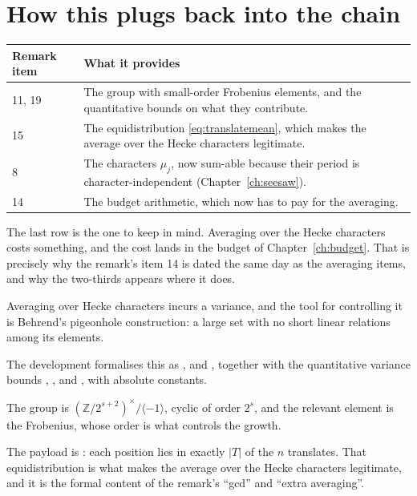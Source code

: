 \section{How this plugs back into the chain}\begin{center}
\begin{tabular}{@{}l>{\RaggedRight\arraybackslash\hyphenpenalty=10000\exhyphenpenalty=10000}p{}@{}}
\toprule
\textbf{Remark item} & \textbf{What it provides} \\
\midrule
11, 19 & The group with small-order Frobenius elements, and the quantitative
bounds on what they contribute. \\
15 & The equidistribution \eqref{eq:translatemean}, which makes the average
over the Hecke characters legitimate. \\
8 & The characters $\mu_j$, now sum-able because their period is
character-independent (Chapter~\ref{ch:seesaw}). \\
14 & The budget arithmetic, which now has to pay for the averaging. \\
\bottomrule
\end{tabular}
\end{center}

The last row is the one to keep in mind. Averaging over the Hecke characters
costs something, and the cost lands in the budget of Chapter~\ref{ch:budget}.
That is precisely why the remark's item 14 is dated the same day as the
averaging items, and why the two-thirds appears where it does.

\begin{keytakeaways}
\item Averaging over Hecke characters incurs a variance, and the tool for
controlling it is Behrend's pigeonhole construction: a large set with no
short linear relations among its elements.
\item The development formalises this as , 
and , together with the quantitative variance bounds
, ,  and , with
absolute constants.
\item The group is $(\mathbb{Z}/2^{s+2})^\times / \langle -1\rangle$, cyclic of
order $2^s$, and the relevant element is the Frobenius, whose order is what
controls the growth.
\item The payload is : each position lies in exactly
$|T|$ of the $n$ translates. That equidistribution is what makes the average
over the Hecke characters legitimate, and it is the formal content of the
remark's ``gcd'' and ``extra averaging''.
\end{keytakeaways}
